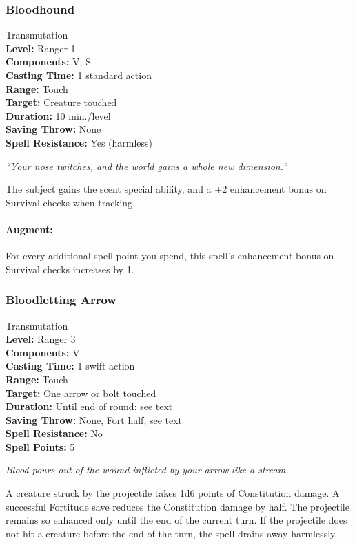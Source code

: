 \subsubsection{Bloodhound}
\label{Spell:Bloodhound}
Transmutation
\\ \textbf{Level:} Ranger 1
\\ \textbf{Components:} V, S
\\ \textbf{Casting Time:} 1 standard action
\\ \textbf{Range:} Touch
\\ \textbf{Target:} Creature touched
\\ \textbf{Duration:} 10 min./level
\\ \textbf{Saving Throw:} None
\\ \textbf{Spell Resistance:} Yes (harmless)

\emph{``Your nose twitches, and the world gains a whole new dimension.''}

The subject gains the scent special ability, and a +2 enhancement bonus on Survival checks when tracking.

\paragraph{Augment:} For every additional spell point you spend, this spell's enhancement bonus on Survival checks increases by 1.
\subsubsection{Bloodletting Arrow}
\label{Spell:BloodlettingArrow}
Transmutation
\\ \textbf{Level:} Ranger 3
\\ \textbf{Components:} V
\\ \textbf{Casting Time:} 1 swift action
\\ \textbf{Range:} Touch
\\ \textbf{Target:} One arrow or bolt touched
\\ \textbf{Duration:} Until end of round; see text
\\ \textbf{Saving Throw:} None, Fort half; see text
\\ \textbf{Spell Resistance:} No
\\ \textbf{Spell Points:} 5

\emph{Blood pours out of the wound inflicted by your arrow like a stream.}

A creature struck by the projectile takes 1d6 points of Constitution damage.
A successful Fortitude save reduces the Constitution damage by half.
The projectile remains so enhanced only until the end of the current turn. 
If the projectile does not hit a creature before the end of the turn, the spell drains away harmlessly.

